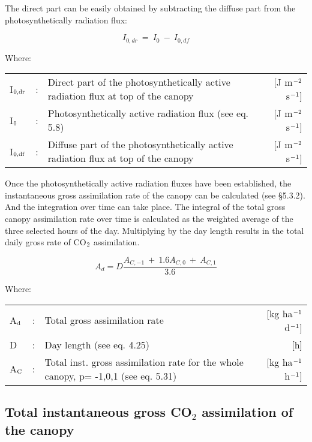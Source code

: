 The direct part can be easily obtained by subtracting the diffuse part from the
 photosynthetically radiation flux:

\begin{equation}
I_{0,dr} ~=~ I_{0} ~-~I_{0,df} 
\end{equation}
 
Where:\\[5pt]
\begin{tabularx}{\textwidth}{llXr}
I$_{{\rm 0,dr}}$ &:& Direct part of the photosynthetically active radiation flux 
   at top of the canopy    &    [J m$^{{\rm -2}}$ s$^{{\rm -1}}$]\\
I$_{{\rm 0}}$ &:& Photosynthetically active radia\-tion flux (see eq. 5.8)    &  
   [J m$^{{\rm -2}}$ s$^{{\rm -1}}$]\\
I$_{{\rm 0,df}}$ &:& Diffuse part of the photosynthetically active radiation flux 
   at top of the canopy     &   [J m$^{{\rm -2}}$ s$^{{\rm -1}}$]\\
\end{tabularx}

Once the photosynthetically active radiation fluxes have been established, the 
instanta\-neous gross assimilation rate of the canopy can be calculated (see \S 5.3.2). And the 
integration over time can take place.
The integral of the total gross canopy assimilation rate over time is calculated as the
weighted average of the three selected hours of the day. Multiply\-ing by the day length
results in the total daily gross rate of CO$_{{\rm 2}}$ assimilation. 

\begin{equation}
A_{d} = D {\frac{A_{C,-1} ~+~ 1.6 A_{C,0} ~+~ A_{C,1} }{3.6}}
\end{equation}

Where:\\[5pt]
\begin{tabularx}{\textwidth}{llXr}
A$_{{\rm d}}$ &:& Total gross assimilation rate    &    [kg ha$^{{\rm -1}}$ d$^{{\rm -1}}$]\\
D &:& Day length (see eq. 4.25)   &     [h]\\
A$_{{\rm C}}$ &:& Total inst. gross assimila\-tion rate for
   the whole canopy, p= -1,0,1 (see eq. 5.31)    &    [kg ha$^{{\rm -1}}$ h$^{{\rm -1}}$]\\
\end{tabularx}

\subsection{Total instantaneous gross CO$_{2}$ assimilation of the canopy}  

